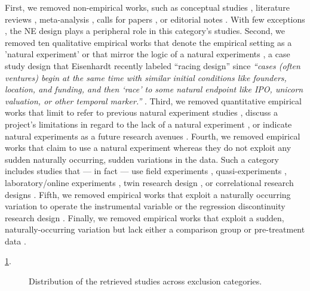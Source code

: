 First, we removed non-empirical works, such as conceptual studies 
\parencite[e.g.,][]{eden2021}, literature reviews
\parencite[e.g.,][]{shaver2020}, meta-analysis
\parencite[e.g.,][]{geyskens2006}, calls for papers
\parencite[e.g.,][]{jacquart2020}, or editorial notes
\parencite[e.g.,][]{breschi2020}. With few exceptions
\parencite[e.g.,][]{sieweke2020}, the NE design plays a peripheral role in this
category's studies. Second, we removed ten qualitative empirical works that 
denote the empirical setting as a 'natural experiment' \parencite[][]{} or that mirror
the logic of a natural experiments \parencite[e.g.,][]{powell2017}, a case study
design that Eisenhardt recently labeled ``racing design'' since \textit{``cases
(often ventures) begin at the same time with similar initial conditions like
founders, location, and funding, and then `race' to some natural endpoint like
IPO, unicorn valuation, or other temporal marker.''} \parencite[page
150,][]{eisenhardt2021}.  Third, we removed quantitative empirical works that limit to refer
to previous natural experiment studies \parencite[e.g.,][]{stevens2021}, discuss
a project's limitations in regard to the lack of a natural experiment
\parencite[e.g.,][]{chen2020}, or indicate natural experiments as a future
research avenues \parencite[e.g.,][]{xie0000}.  Fourth, we removed empirical
works that claim to use a natural experiment whereas they do not exploit any
sudden naturally occurring, sudden variations in the data. Such a category
includes studies that --- in fact --- use field experiments
\parencite[e.g.,][]{lee2017}, quasi-experiments
\parencite[e.g.,][]{azoulay2014}, laboratory/online experiments
\parencite[e.g.,][]{laurieromartinez2014}, twin research design
\parencite[e.g.,][]{nicolaou2008}, or correlational research designs
\parencite[e.g.,][]{boyle2011}. Fifth, we removed empirical works that exploit a
naturally occurring variation to operate the instrumental variable
\parencite[e.g.,][]{zolotoy2018} or the regression discontinuity research design
\parencite[e.g.,][]{flammer2015}.  Finally, we removed empirical works that
exploit a sudden, naturally-occurring  variation but lack either a comparison
group \parencite[e.g.][]{corbo2016} or pre-treatment data
\parencite[e.g.,][]{desjardine2019}.

\ref{fig:exclusion_causes}. 

\begin{figure}
    \centering
    \sffamily
    \begin{small}
        \begin{center}
            
        \end{center}
        \caption{Distribution of the retrieved studies across exclusion 
        categories.}
        \label{fig:exclusion_causes}
    \end{small}
\end{figure}
